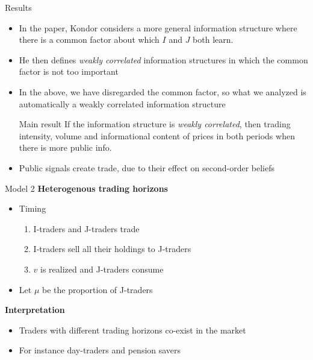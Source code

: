\documentclass[english,10pt
,aspectratio=169
]{beamer}
\begin{document}
\begin{frame}{Results}
	\begin{itemize}
		\item In the paper, Kondor considers a more general information structure where there is a common factor about which $I$ and $J$ both learn.
		\item He then defines \textit{weakly correlated} information structures in which the common factor  is not too important
		\item In the above, we have disregarded the common factor, so what we analyzed is automatically a weakly correlated information structure
		\begin{block}{Main result}
			If the information structure is \textit{weakly correlated}, then trading intensity, volume and informational content of prices  in both periods when there is more public info.
		\end{block}
		\item Public signals  create trade, due to their effect on second-order beliefs
	\end{itemize}
\end{frame}


\begin{frame}{Model 2}
	\textbf{Heterogenous trading horizons}
	\begin{itemize}
		\item Timing
		\begin{enumerate}
			\item I-traders and J-traders trade
			\item I-traders sell all their holdings to J-traders
			\item $v$ is realized and J-traders consume
		\end{enumerate}
		\item Let $\mu$ be the proportion of J-traders
	\end{itemize}
	\textbf{Interpretation}
	\begin{itemize}
		\item Traders with different trading horizons co-exist in the market
		\item For instance day-traders and pension savers
	\end{itemize}
\end{frame}
\end{document}
